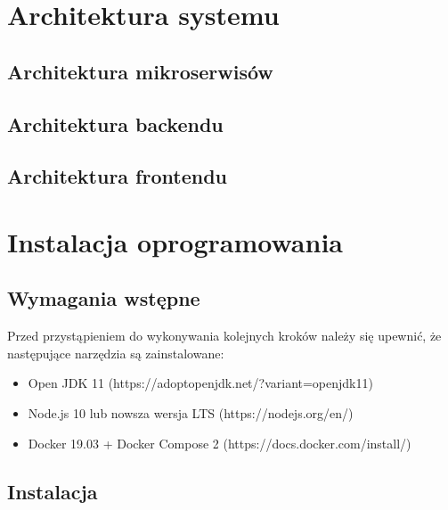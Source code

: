 \section{Architektura systemu}\label{sec:system-architecture}
\subsection{Architektura mikroserwisów}\label{subsec:system-architecture:microservices}


\subsection{Architektura backendu}\label{subsec:system-architecture:backend}

\subsection{Architektura frontendu}\label{subsec:system-architecture:frontend}

\section{Instalacja oprogramowania}\label{sec:software-installation}
\subsection{Wymagania wstępne}\label{subsec:prerequirements}
Przed przystąpieniem do wykonywania kolejnych kroków należy się upewnić, że następujące narzędzia są zainstalowane:
\begin{itemize}
    \item Open JDK 11 (https://adoptopenjdk.net/?variant=openjdk11)
    \item Node.js 10 lub nowsza wersja LTS (https://nodejs.org/en/)
    \item Docker 19.03 + Docker Compose 2 (https://docs.docker.com/install/)
\end{itemize}

\subsection{Instalacja}\label{subsec:installation}

